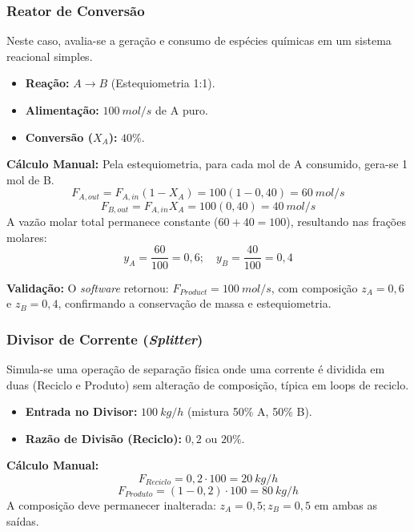 \subsubsection{Reator de Conversão}

Neste caso, avalia-se a geração e consumo de espécies químicas em um sistema reacional simples.

\begin{itemize}
    \item \textbf{Reação:} $A \to B$ (Estequiometria 1:1).
    \item \textbf{Alimentação:} $100 \ mol/s$ de A puro.
    \item \textbf{Conversão ($X_A$):} $40\%$.
\end{itemize}

\textbf{Cálculo Manual:}
Pela estequiometria, para cada mol de A consumido, gera-se 1 mol de B.
\begin{equation}
    F_{A,out} = F_{A,in}(1 - X_A) = 100(1 - 0,40) = 60 \ mol/s
\end{equation}
\begin{equation}
    F_{B,out} = F_{A,in} X_A = 100(0,40) = 40 \ mol/s
\end{equation}
A vazão molar total permanece constante ($60+40=100$), resultando nas frações molares:
\begin{equation}
    y_A = \frac{60}{100} = 0,6; \quad y_B = \frac{40}{100} = 0,4
\end{equation}

\textbf{Validação:}
O \textit{software} retornou: $F_{Product} = 100 \ mol/s$, com composição $z_A=0,6$ e $z_B=0,4$, confirmando a conservação de massa e estequiometria.

\subsubsection{Divisor de Corrente (\textit{Splitter})}

Simula-se uma operação de separação física onde uma corrente é dividida em duas (Reciclo e Produto) sem alteração de composição, típica em loops de reciclo.

\begin{itemize}
    \item \textbf{Entrada no Divisor:} $100 \ kg/h$ (mistura 50\% A, 50\% B).
    \item \textbf{Razão de Divisão (Reciclo):} $0,2$ ou $20\%$.
\end{itemize}

\textbf{Cálculo Manual:}
\begin{equation}
    F_{Reciclo} = 0,2 \cdot 100 = 20 \ kg/h
\end{equation}
\begin{equation}
    F_{Produto} = (1 - 0,2) \cdot 100 = 80 \ kg/h
\end{equation}
A composição deve permanecer inalterada: $z_A=0,5; z_B=0,5$ em ambas as saídas.

